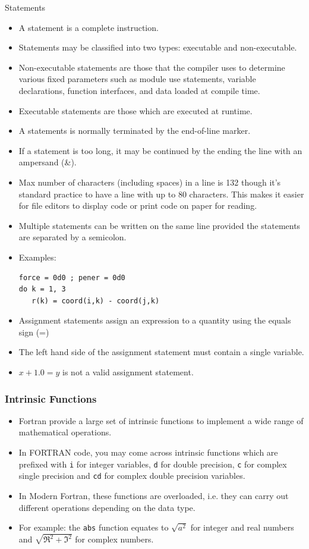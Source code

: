 \documentclass[c,mathserif,compress,xcolor=svgnames]{beamer}
\newcommand{\lstfortran}[1]{\lstinline[language={[90]Fortran},basicstyle=\footnotesize\ttfamily]|#1|}
\begin{document}
\begin{frame}{Statements}
  \begin{itemize}
    \item A statement is a complete instruction.
    \item Statements may be classified into two types: executable and non-executable.
    \item Non-executable statements are those that the compiler uses to determine various fixed parameters such as module use statements, variable declarations, function interfaces, and data loaded at compile time.
    \item Executable statements are those which are executed at runtime.
    \item A statements is normally terminated by the end-of-line marker.
    \item If a statement is too long, it may be continued by the ending the line with an ampersand (\&).
    \item Max number of characters (including spaces) in a line is 132 though it's standard practice to have a line with up to 80 characters. This makes it easier for file editors to display code or print code on paper for reading.
    \item Multiple statements can be written on the same line provided the statements are separated by a semicolon.
    \item Examples:
      \begin{lstlisting}[language={[90]Fortran}]
force = 0d0 ; pener = 0d0
do k = 1, 3
   r(k) = coord(i,k) - coord(j,k)
      \end{lstlisting}
    \item Assignment statements assign an expression to a quantity using the equals sign (=)
    \item The left hand side of the assignment statement must contain a single variable.
    \item $x + 1.0 = y$ is not a valid assignment statement.
  \end{itemize}
\end{frame}

\begin{frame}
  \frametitle{Intrinsic Functions}
  \begin{itemize}
    \item Fortran provide a large set of intrinsic functions to implement a wide range of mathematical operations.
    \item In FORTRAN code, you may come across intrinsic functions which are prefixed with \texttt{i} for integer variables, \texttt{d} for double precision, \texttt{c} for complex single precision and \texttt{cd} for complex double precision variables.
    \item In Modern Fortran, these functions are overloaded, i.e. they can carry out different operations depending on the data type.
    \item For example: the \lstfortran{abs} function equates to $\sqrt{a^2}$ for integer and real numbers and $\sqrt{\Re^2 + \Im^2}$ for complex numbers.
  \end{itemize}
\end{frame}
\end{document}
